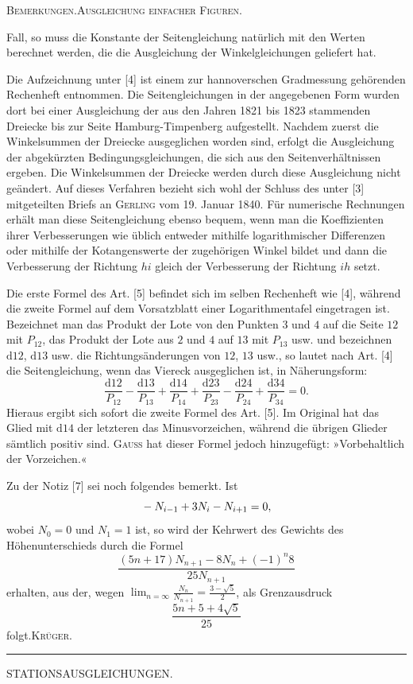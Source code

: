 \clearpage
{}\hfill\textsc{Bemerkungen.\quad Ausgleichung einfacher Figuren.}\hfill\mbox{}\par\medskip
\begingroup\footnotesize
\noindent Fall, so muss die Konstante der Seitengleichung natürlich mit den Werten berechnet werden, die die Ausgleichung der Winkelgleichungen geliefert hat.

Die Aufzeichnung unter [4] ist einem zur hannoverschen Gradmessung gehörenden Rechenheft entnommen. Die Seitengleichungen in der angegebenen Form wurden dort bei einer Ausgleichung der aus den Jahren 1821 bis 1823 stammenden Dreiecke bis zur Seite Hamburg-Timpenberg aufgestellt. Nachdem zuerst die Winkelsummen der Dreiecke ausgeglichen worden sind, erfolgt die Ausgleichung der abgekürzten Bedingungsgleichungen, die sich aus den Seitenverhältnissen ergeben. Die Winkelsummen der Dreiecke werden durch diese Ausgleichung nicht geändert. Auf dieses Verfahren bezieht sich wohl der Schluss des unter [3] mitgeteilten Briefs an \textsc{Gerling} vom 19. Januar 1840. Für numerische Rechnungen erhält man diese Seitengleichung ebenso bequem, wenn man die Koeffizienten ihrer Verbesserungen wie üblich entweder mithilfe logarithmischer Differenzen oder mithilfe der Kotangenswerte der zugehörigen Winkel bildet und dann die Verbesserung der Richtung $hi$ gleich der Verbesserung der Richtung $ih$ setzt.

Die erste Formel des Art. [5] befindet sich im selben Rechenheft wie [4], während die zweite Formel auf dem Vorsatzblatt einer Logarithmentafel eingetragen ist. Bezeichnet man das Produkt der Lote von den Punkten $3$ und $4$ auf die Seite $12$ mit $P_{12}$, das Produkt der Lote aus $2$ und $4$ auf $13$ mit $P_{13}$ usw. und bezeichnen $\mathrm d12$, $\mathrm d13$ usw. die Richtungsänderungen von $12$, $13$ usw., so lautet nach Art. [4] die Seitengleichung, wenn das Viereck ausgeglichen ist, in Näherungsform:
\[
\frac{\mathrm d12}{P_{12}}-\frac{\mathrm d13}{P_{13}}+\frac{\mathrm d14}{P_{14}}+\frac{\mathrm d23}{P_{23}}-\frac{\mathrm d24}{P_{24}}+\frac{\mathrm d34}{P_{34}}=0.
\]
Hieraus ergibt sich sofort die zweite Formel des Art. [5]. Im Original hat das Glied mit $\mathrm d14$ der letzteren das Minusvorzeichen, während die übrigen Glieder sämtlich positiv sind. \textsc{Gauss} hat dieser Formel jedoch hinzugefügt: »Vorbehaltlich der Vorzeichen.«

Zu der Notiz [7] sei noch folgendes bemerkt. Ist
\[
\llap{\raisebox{1ex}{\text{\tiny.}}\hspace{4cm}}-N_{i-1}+3N_i-N_{i+1}=0,
\]
\noindent wobei $N_0=0$ und $N_1=1$ ist, so wird der Kehrwert des Gewichts des Höhenunterschieds durch die Formel
\[
\frac{(5n+17)N_{n+1}-8N_n+(-1)^n8}{25N_{n+1}}
\]
\noindent erhalten, aus der, wegen $\displaystyle\lim_{n=\infty}\frac{N_n}{N_{n+1}}=\frac{3-\sqrt5}{2}$, als Grenzausdruck
\[
\frac{5n+5+4\sqrt5}{25}
\]
\noindent folgt.\hfill\textsc{Krüger.}\par
\endgroup
\vspace{1.6cm}
\begin{center}\rule{4cm}{.4pt}\end{center}

\clearpage
\null{}
\begin{center}{\LARGE STATIONSAUSGLEICHUNGEN.}\end{center}
\endgroup
